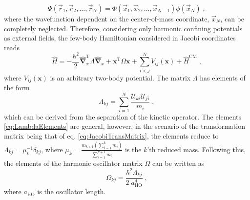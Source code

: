 \begin{equation}
	\Psi \left( \vec{r}_1 , \vec{r}_2 , \ldots , \vec{r}_N \right) = \Phi \left( \vec{x}_1 , \vec{x}_2 , \ldots , \vec{x}_{N-1} \right) \phi( \vec{x}_N ) \; ,
\end{equation}
where the wavefunction dependent on the center-of-mass coordinate, $\vec{x}_N$, can be completely neglected.
Therefore, considering only harmonic confining potentials as external fields, the few-body Hamiltonian considered in Jacobi coordinates reads 
\begin{equation}
	\hat{H} = - \frac{\hbar^2}{2} \hat{\boldsymbol{\nabla}}_{x}^{\mathrm{T}} \Lambda \hat{\boldsymbol{\nabla}}_x + \boldsymbol{x}^{\mathrm{T}} \Omega \boldsymbol{x} + \sum_{i < j}^{N} V_{ij}(\boldsymbol{x}) + \hat{H}^{\mathrm{CM}} \; ,
\end{equation}
where $V_{ij}(\boldsymbol{x})$ is an arbitrary two-body potential. The matrix $\Lambda$ has elements of the form
\begin{equation}
	\Lambda_{kj} = \sum_{i = 1}^{N} \frac{\mathcal{U}_{ki} \mathcal{U}_{ji}}{m_i} \; ,
	\label{eq:LambdaElements}
\end{equation}
which can be derived from the separation of the kinetic operator. The elements \eqref{eq:LambdaElements} are general, however, in the scenario of the transformation matrix being that of eq. \eqref{eq:JacobiTransMatrix}, the elements reduce to $\Lambda_{kj} = \mu_{k}^{-1} \delta_{kj}$, where $\mu_k = \frac{m_{k+1} \left( \sum_{i= 1}^{k} m_{i} \right)}{\sum_{i= 1}^{k+1} m_{i}}$ is the $k$'th reduced mass.
Following this, the elements of the harmonic oscillator matrix $\Omega$ can be written as
\begin{equation}
	\Omega_{kj} = \frac{\hbar^2 \Lambda_{kj} }{2 \;  a_{\mathrm{HO}}^4 } \; ,
\end{equation}
where $a_{\mathrm{HO}}$ is the oscillator length.